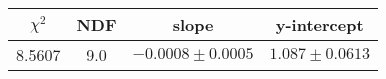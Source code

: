\begin{tabular}{|c|c|c|c|}

\hline
$\chi^{2}$ & NDF & slope & y-intercept  \\
\hline
8.5607 & 9.0 & $-0.0008\pm0.0005$ & $1.087\pm0.0613$ \\
\hline

\end{tabular}